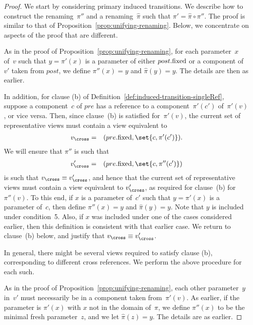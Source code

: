 
\begin{proof}
We start by considering primary induced transitions.  We describe how to
construct the renaming~$\pi''$ and a renaming~$\hat\pi$ such that $\pi' =
\hat\pi \circ \pi''$.  The proof is similar to that of
Proposition~\ref{prop:unifying-renaming}.  Below, we concentrate on aspects of
the proof that are different.

As in the proof of Proposition~\ref{prop:unifying-renaming}, for each
parameter~$x$ of~$v$ such that $y = \pi'(x)$ is a parameter of either
$post.\mathrm{fixed}$ or a component of $v'$ taken from $post$, we define $\pi''(x) =
y$ and $\hat\pi(y) = y$.  The details are then as earlier.

In addition, for clause (b) of
Definition~\ref{def:induced-transition-singleRef}, suppose a component~$c$ of
$pre$ has a reference to a component~$\pi'(c')$ of~$\pi'(v)$, or vice versa.
Then, since clause~(b) is satisfied for~$\pi'(v)$, the current set of
representative views must contain a view equivalent to 
\begin{eqnarray*}
v_\cross & = & (pre.\fixed, \set{c,\pi'(c')}).
\end{eqnarray*}
%
We will ensure that $\pi''$ is such that
%
\begin{eqnarray*}
v_\cross' & = & (pre.\fixed, \set{c,\pi''(c')})
\end{eqnarray*}
%
is such that $v_\cross \equiv v_\cross'$, and hence that the current set of
representative views must contain a view equivalent to $v_\cross'$, as
required for clause~(b) for~$\pi''(v)$.  To this end, if $x$ is a parameter
of~$c'$ such that $y = \pi'(x)$ is a parameter of~$c$, then define $\pi''(x) =
y$ and $\hat\pi(y) = y$.  Note that $y$ is included under condition~5.  Also,
if $x$ was included under one of the cases considered earlier, then this
definition is consistent with that earlier case.  We return to clause~(b)
below, and justify that $v_\cross \equiv v_\cross'$.

In general, there might be several views required to satisfy clause (b),
corresponding to different cross references.  We perform the above procedure
for each such. 

As in the proof of Proposition~\ref{prop:unifying-renaming}, each other
parameter~$y$ in~$v'$ must necessarily be in a component taken from~$\pi'(v)$.
As earlier, if the parameter is $\pi'(x)$ with $x$ not in the domain of~$\pi$,
we define $\pi''(x)$ to be the minimal fresh parameter~$z$, and we let
$\hat\pi(z) = y$.  The details are as earlier.


\end{proof}
